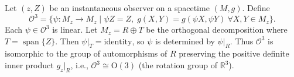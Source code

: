 Let $(z, Z)$ be an instantaneous observer on a spacetime $(M, g)$. Define
$$\mathcal{O}^3 = \{\psi: M_z \to M_z \mid \psi Z = Z,\; g(X, Y) = g(\psi X, \psi Y)\ \forall X, Y \in M_z\}.$$
Each $\psi \in \mathcal{O}^3$ is linear. Let $M_z = R \oplus T$ be the orthogonal decomposition where $T = \operatorname{span}\{Z\}$. Then $\psi|_T = \text{identity}$, so $\psi$ is determined by $\psi|_R$. Thus $\mathcal{O}^3$ is isomorphic to the group of automorphisms of $R$ preserving the positive definite inner product $g_z|_R$, i.e., $\mathcal{O}^3 \cong \mathrm{O}(3)$ (the rotation group of $\mathbb{R}^3$).
